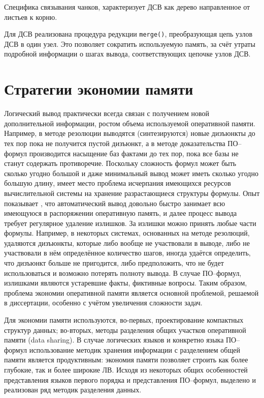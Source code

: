 Специфика связывания чанков, характеризует ДСВ как дерево направленное от листьев к корню.

Для ДСВ реализована процедура редукции {\tt merge()}, преобразующая цепь узлов ДСВ в один узел. Это позволяет сократить используемую память, за счёт утраты подробной информации о шагах вывода, соответствующих цепочке узлов ДСВ.




\section{Стратегии экономии памяти}
Логический вывод практически всегда связан с получением новой дополнительной информации, ростом объема используемой оперативной памяти. Например, в методе резолюции выводятся (синтезируются) новые дизъюнкты до тех пор пока не получится пустой дизъюнкт, а в методе доказательства ПО--формул производится насыщение баз фактами до тех пор, пока все базы не станут содержать противоречие. Поскольку сложность формул может быть сколько угодно большой и даже минимальный вывод может иметь сколько угодно большую длину, имеет место проблема исчерпания имеющихся ресурсов вычислительной системы на хранение разрастающиеся структуры формулы. Опыт показывает \cite{TermIndexingBook}, что автоматический вывод довольно быстро занимает всю имеющуюся в распоряжении оперативную память, и далее процесс вывода требует регулярное удаление излишков. За излишки можно принять любые части формулы. Например, в некоторых системах, основанных на методе резолюций, удаляются дизъюнкты, которые либо вообще не участвовали в выводе, либо не участвовали в нём определённое количество шагов, иногда удаётся определить, что дизъюнкт больше не пригодится, либо предположить, что не будет использоваться и возможно потерять полноту вывода. В случае ПО--формул, излишками являются устаревшие факты, фиктивные вопросы. Таким образом, проблема экономии оперативной памяти является основной проблемой, решаемой в диссертации, особенно с учётом увеличения сложности задач.

Для экономии памяти используются, во-первых, проектирование компактных структур данных; во-вторых, методы разделения общих участков оперативной памяти (data sharing). В случае логических языков и конкретно языка ПО--формул использование методик хранения информации с разделением общей памяти является продуктивным: экономия памяти позволяет строить как более глубокие, так и более широкие ЛВ. Исходя из некоторых общих особенностей представления языков первого порядка и представления ПО--формул, выделено и реализован ряд методик разделения данных.



